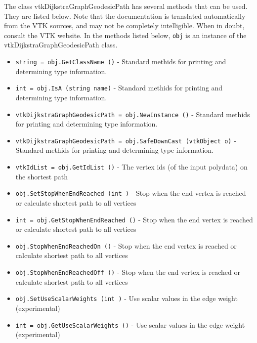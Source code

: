 The class vtkDijkstraGraphGeodesicPath has several methods that can be used.
  They are listed below.
Note that the documentation is translated automatically from the VTK sources,
and may not be completely intelligible.  When in doubt, consult the VTK website.
In the methods listed below, \verb|obj| is an instance of the vtkDijkstraGraphGeodesicPath class.
\begin{itemize}
\item  \verb|string = obj.GetClassName ()| -  Standard methids for printing and determining type information.

\item  \verb|int = obj.IsA (string name)| -  Standard methids for printing and determining type information.

\item  \verb|vtkDijkstraGraphGeodesicPath = obj.NewInstance ()| -  Standard methids for printing and determining type information.

\item  \verb|vtkDijkstraGraphGeodesicPath = obj.SafeDownCast (vtkObject o)| -  Standard methids for printing and determining type information.

\item  \verb|vtkIdList = obj.GetIdList ()| -  The vertex ids (of the input polydata) on the shortest path

\item  \verb|obj.SetStopWhenEndReached (int )| -  Stop when the end vertex is reached 
 or calculate shortest path to all vertices

\item  \verb|int = obj.GetStopWhenEndReached ()| -  Stop when the end vertex is reached 
 or calculate shortest path to all vertices

\item  \verb|obj.StopWhenEndReachedOn ()| -  Stop when the end vertex is reached 
 or calculate shortest path to all vertices

\item  \verb|obj.StopWhenEndReachedOff ()| -  Stop when the end vertex is reached 
 or calculate shortest path to all vertices

\item  \verb|obj.SetUseScalarWeights (int )| -  Use scalar values in the edge weight (experimental)

\item  \verb|int = obj.GetUseScalarWeights ()| -  Use scalar values in the edge weight (experimental)


\end{itemize}
